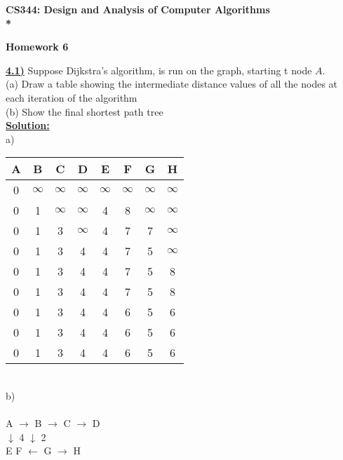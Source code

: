 \documentclass{article}
\begin{document}
\begin{center}
\bf{\LARGE CS344: Design and Analysis of Computer Algorithms} \\*

\vspace{0.2in}
{\bf {\Large Homework 6}}
\end{center}

\vspace{.2in}


\vspace{.2in}
\noindent \textbf{\underline{4.1)}} Suppose Dijkstra's algorithm, is run on the graph, starting t node $A$.\\

\indent (a) Draw a table showing the intermediate distance values of all the nodes at each iteration of the algorithm \\
\indent (b) Show the final shortest path tree \\

\noindent \textbf{\underline{Solution:}}  \\
a) \\
\begin{tabular}{ | c c c c c c c c |}
  \hline
  A & B & C & D & E & F & G & H\\ \hline
  0 & $\infty$ & $\infty$ & $\infty$ & $\infty$ & $\infty$ & $\infty$ & $\infty$ \\
  0 & 1 & $\infty$ & $\infty$ & 4 & 8 & $\infty$ & $\infty$\\
  0 & 1 & 3 & $\infty$ & 4 & 7 & 7 & $\infty$\\
  0 & 1 & 3 & 4 & 4 & 7 & 5 & $\infty$\\
  0 & 1 & 3 & 4 & 4 & 7 & 5 & 8\\
  0 & 1 & 3 & 4 & 4 & 7 & 5 & 8\\
  0 & 1 & 3 & 4 & 4 & 6 & 5 & 6\\
  0 & 1 & 3 & 4 & 4 & 6 & 5 & 6\\
  0 & 1 & 3 & 4 & 4 & 6 & 5 & 6\\
  \hline
\end{tabular} \\

\vspace{.2in}
\noindent b) \\
   \\
     A   $\rightarrow$    B         $\rightarrow$          C         $\rightarrow$        D\\
      $\downarrow$ 4 \indent \indent $\downarrow$ 2 \\
      E \indent F $\leftarrow$ G $\rightarrow$ H\\
\indent {} \indent {}\\
\end{document}
